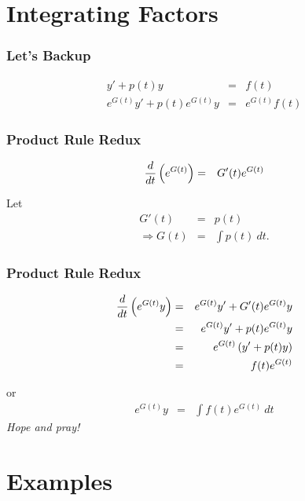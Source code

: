 \section{Integrating Factors}

\begin{frame}
  \frametitle{Let's Backup}

  \begin{eqnarray*}
    y' + p(t) y & = & f(t) \\
    e^{G(t)} y' + p(t) e^{G(t)} y & = & e^{G(t)} f(t)
  \end{eqnarray*}


\end{frame}



\begin{frame}
  \frametitle{Product Rule Redux}

  \begin{eqnarray*}
    \frac{d}{dt} \left( e^{G(t)} \right) & = & G'(t) e^{G(t)} 
  \end{eqnarray*}

  Let
  \begin{eqnarray*}
    G'(t) & = & p(t) \\
    \Rightarrow G(t) & = & \int p(t) ~ dt.
  \end{eqnarray*}


\end{frame}


\begin{frame}
  \frametitle{Product Rule Redux}

  \begin{eqnarray*}
    \frac{d}{dt} \left( e^{G(t)} y \right) & = & e^{G(t)} y' + G'(t) e^{G(t)} y \\
    & = & e^{G(t)} y' + p(t) e^{G(t)} y \\
    & = & e^{G(t)} \left( y' + p(t) y \right) \\
    & = & f(t) e^{G(t)}
  \end{eqnarray*}

  or
  \begin{eqnarray*}
    e^{G(t)} y & = & \int f(t) e^{G(t)} ~ dt
  \end{eqnarray*}
  \textit{Hope and pray!}

\end{frame}


\section{Examples}

